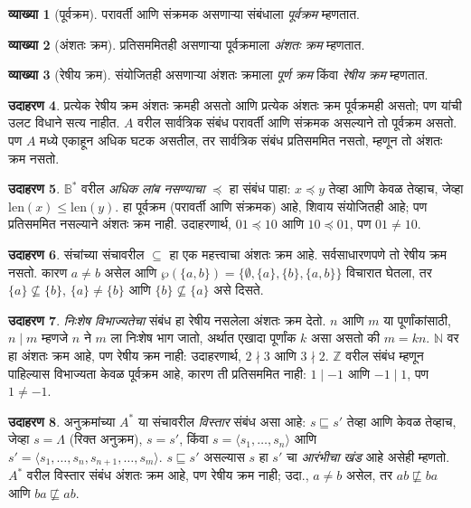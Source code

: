 \documentclass[11pt,a4paper,openany]{book}
\theoremstyle{definition}
\newtheorem{defn}{व्याख्या}[section]
\newtheorem{ex}[defn]{उदाहरण}
\newcommand{\Pow}[1]{\wp(#1)}
\newcommand{\tuple}[1]{\langle #1\rangle}
\newcommand{\Nat}{\mathbb{N}}
\newcommand{\Int}{\mathbb{Z}}
\newcommand{\Bin}{\mathbb{B}}
\newcommand{\len}[1]{\mathrm{len}(#1)}
\newcommand{\emptyseq}{\Lambda}
\begin{document}
\begin{defn}[पूर्वक्रम]
परावर्ती आणि संक्रमक असणाऱ्या संबंधाला \emph{पूर्वक्रम} म्हणतात.
\end{defn}

\begin{defn}[अंशतः क्रम]
प्रतिसममितही असणाऱ्या पूर्वक्रमाला \emph{अंशतः क्रम} म्हणतात.
\end{defn}

\begin{defn}[रेषीय क्रम]\label{sfr:rel:ord:def:linearorder}
संयोजितही असणाऱ्या अंशतः क्रमाला \emph{पूर्ण क्रम} किंवा \emph{रेषीय क्रम}
म्हणतात.
\end{defn}

\begin{ex}
प्रत्येक रेषीय क्रम अंशतः क्रमही असतो आणि प्रत्येक अंशतः क्रम पूर्वक्रमही
असतो; पण यांची उलट विधाने सत्य नाहीत. $A$ वरील सार्वत्रिक संबंध परावर्ती
आणि संक्रमक असल्याने तो पूर्वक्रम असतो. पण $A$ मध्ये एकाहून अधिक
घटक असतील, तर सार्वत्रिक संबंध प्रतिसममित नसतो, म्हणून तो
अंशतः क्रम नसतो.
\end{ex}

\begin{ex}
$\Bin^*$ वरील \emph{अधिक लांब नसण्याचा} $\preccurlyeq$ हा संबंध पाहा:
$x \preccurlyeq y$ तेव्हा आणि केवळ तेव्हाच, जेव्हा $\len{x} \le \len{y}$.
हा पूर्वक्रम (परावर्ती आणि संक्रमक) आहे, शिवाय संयोजितही आहे; पण
प्रतिसममित नसल्याने अंशतः क्रम नाही. उदाहरणार्थ,
$01 \preccurlyeq 10$ आणि $10 \preccurlyeq 01$, पण $01 \neq 10$.
\end{ex}

\begin{ex}
संचांच्या संचावरील $\subseteq$ हा एक महत्त्वाचा अंशतः क्रम आहे.
सर्वसाधारणपणे तो रेषीय क्रम नसतो. कारण $a \neq b$ असेल आणि
$\Pow{\{a, b\}} = \{\emptyset, \{a\}, \{b\}, \{a,b\}\}$ विचारात घेतला,
तर $\{a\} \nsubseteq \{b\}$, $\{a\} \neq \{b\}$ आणि
$\{b\} \nsubseteq \{a\}$ असे दिसते.
\end{ex}

\begin{ex}
\emph{निःशेष विभाज्यतेचा} संबंध हा रेषीय नसलेला अंशतः क्रम देतो.
$n$ आणि $m$ या पूर्णांकांसाठी, $n \mid m$ म्हणजे $n$ ने $m$ ला निःशेष
भाग जातो, अर्थात एखादा पूर्णांक $k$ असा असतो की $m = kn$.
$\Nat$ वर हा अंशतः क्रम आहे, पण रेषीय क्रम नाही: उदाहरणार्थ,
$2 \nmid 3$ आणि $3 \nmid 2$. $\Int$ वरील संबंध म्हणून पाहिल्यास
विभाज्यता केवळ पूर्वक्रम आहे, कारण ती प्रतिसममित नाही:
$1 \mid -1$ आणि $-1 \mid 1$, पण $1 \neq -1$.
\end{ex}

\begin{ex}
अनुक्रमांच्या $A^*$ या संचावरील \emph{विस्तार} संबंध असा आहे:
$s \sqsubseteq s'$ तेव्हा आणि केवळ तेव्हाच, जेव्हा $s = \emptyseq$
(रिक्त अनुक्रम), $s = s'$, किंवा $s = \tuple{s_1, \dots, s_n}$ आणि
$s' = \tuple{s_1, \dots, s_n, s_{n+1}, \dots, s_m}$.
$s \sqsubseteq s'$ असल्यास $s$ हा $s'$ चा \emph{आरंभीचा खंड} आहे असेही
म्हणतो. $A^*$ वरील विस्तार संबंध अंशतः क्रम आहे, पण रेषीय क्रम नाही;
उदा., $a \neq b$ असेल, तर $ab \not\sqsubseteq ba$ आणि
$ba \not\sqsubseteq ab$.
\end{ex}
\end{document}
